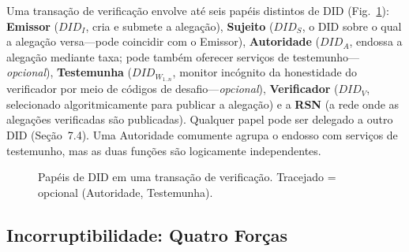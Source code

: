 \documentclass[11pt,a4paper,twocolumn]{article}
\begin{document}
Uma transação de verificação envolve até seis papéis distintos de DID (Fig.~\ref{fig:roles}): \textbf{Emissor} ($DID_I$, cria e submete a alegação), \textbf{Sujeito} ($DID_S$, o DID sobre o qual a alegação versa---pode coincidir com o Emissor), \textbf{Autoridade} ($DID_A$, endossa a alegação mediante taxa; pode também oferecer serviços de testemunho---\emph{opcional}), \textbf{Testemunha} ($DID_{W_{1..n}}$, monitor incógnito da honestidade do verificador por meio de códigos de desafio---\emph{opcional}), \textbf{Verificador} ($DID_V$, selecionado algoritmicamente para publicar a alegação) e a \textbf{RSN} (a rede onde as alegações verificadas são publicadas). Qualquer papel pode ser delegado a outro DID (Seção~7.4). Uma Autoridade comumente agrupa o endosso com serviços de testemunho, mas as duas funções são logicamente independentes.

\begin{figure}[ht]
\centering
{}
\caption{Papéis de DID em uma transação de verificação. Tracejado = opcional (Autoridade, Testemunha).}
\label{fig:roles}
\end{figure}

\subsection{Incorruptibilidade: Quatro Forças}
\end{document}
